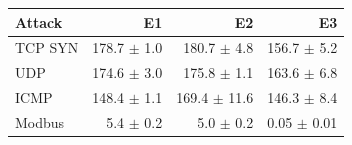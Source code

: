 \begin{tabular}{lrrr}
\toprule
Attack & E1 & E2 & E3\\
\midrule
TCP SYN & 178.7 $\pm$ 1.0 & 180.7 $\pm$ 4.8 & 156.7 $\pm$ 5.2\\
UDP & 174.6 $\pm$ 3.0 & 175.8 $\pm$ 1.1 & 163.6 $\pm$ 6.8\\
ICMP & 148.4 $\pm$ 1.1 & 169.4 $\pm$ 11.6 & 146.3 $\pm$ 8.4\\
Modbus & 5.4 $\pm$ 0.2 & 5.0 $\pm$ 0.2 & 0.05 $\pm$ 0.01\\
\bottomrule
\end{tabular}

